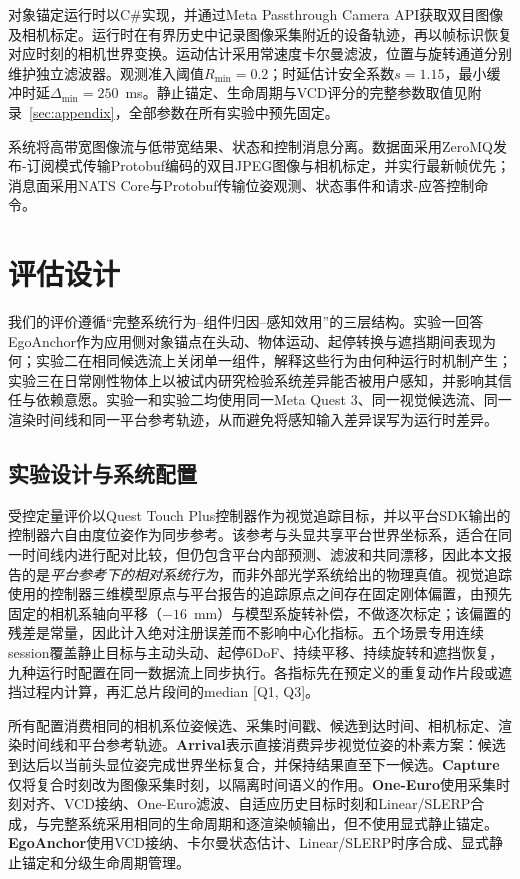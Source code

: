 \documentclass[review]{vgtc}
\begin{document}
对象锚定运行时以C\#实现，并通过Meta Passthrough Camera API获取双目图像及相机标定。运行时在有界历史中记录图像采集附近的设备轨迹，再以帧标识恢复对应时刻的相机世界变换。运动估计采用常速度卡尔曼滤波，位置与旋转通道分别维护独立滤波器。观测准入阈值$R_{\min} = 0.2$；时延估计安全系数$s = 1.15$，最小缓冲时延$\Delta_{\min} = 250$~ms。静止锚定、生命周期与VCD评分的完整参数取值见附录~\ref{sec:appendix}，全部参数在所有实验中预先固定。

系统将高带宽图像流与低带宽结果、状态和控制消息分离。数据面采用ZeroMQ发布-订阅模式传输Protobuf编码的双目JPEG图像与相机标定，并实行最新帧优先；消息面采用NATS Core与Protobuf传输位姿观测、状态事件和请求-应答控制命令。

\section{评估设计}\label{sec:evaluation}

我们的评价遵循“完整系统行为--组件归因--感知效用”的三层结构。实验一回答EgoAnchor作为应用侧对象锚点在头动、物体运动、起停转换与遮挡期间表现为何；实验二在相同候选流上关闭单一组件，解释这些行为由何种运行时机制产生；实验三在日常刚性物体上以被试内研究检验系统差异能否被用户感知，并影响其信任与依赖意愿。实验一和实验二均使用同一Meta Quest 3、同一视觉候选流、同一渲染时间线和同一平台参考轨迹，从而避免将感知输入差异误写为运行时差异。

\subsection{实验设计与系统配置}

受控定量评价以Quest Touch Plus控制器作为视觉追踪目标，并以平台SDK输出的控制器六自由度位姿作为同步参考。该参考与头显共享平台世界坐标系，适合在同一时间线内进行配对比较，但仍包含平台内部预测、滤波和共同漂移，因此本文报告的是\emph{平台参考下的相对系统行为}，而非外部光学系统给出的物理真值。视觉追踪使用的控制器三维模型原点与平台报告的追踪原点之间存在固定刚体偏置，由预先固定的相机系轴向平移（$-16$~mm）与模型系旋转补偿，不做逐次标定；该偏置的残差是常量，因此计入绝对注册误差而不影响中心化指标。五个场景专用连续session覆盖静止目标与主动头动、起停6DoF、持续平移、持续旋转和遮挡恢复，九种运行时配置在同一数据流上同步执行。各指标先在预定义的重复动作片段或遮挡过程内计算，再汇总片段间的median [Q1, Q3]。

所有配置消费相同的相机系位姿候选、采集时间戳、候选到达时间、相机标定、渲染时间线和平台参考轨迹。\textbf{Arrival}表示直接消费异步视觉位姿的朴素方案：候选到达后以当前头显位姿完成世界坐标复合，并保持结果直至下一候选。\textbf{Capture}仅将复合时刻改为图像采集时刻，以隔离时间语义的作用。\textbf{One-Euro}使用采集时刻对齐、VCD接纳、One-Euro滤波、自适应历史目标时刻和Linear/SLERP合成，与完整系统采用相同的生命周期和逐渲染帧输出，但不使用显式静止锚定。\textbf{EgoAnchor}使用VCD接纳、卡尔曼状态估计、Linear/SLERP时序合成、显式静止锚定和分级生命周期管理。
\end{document}
